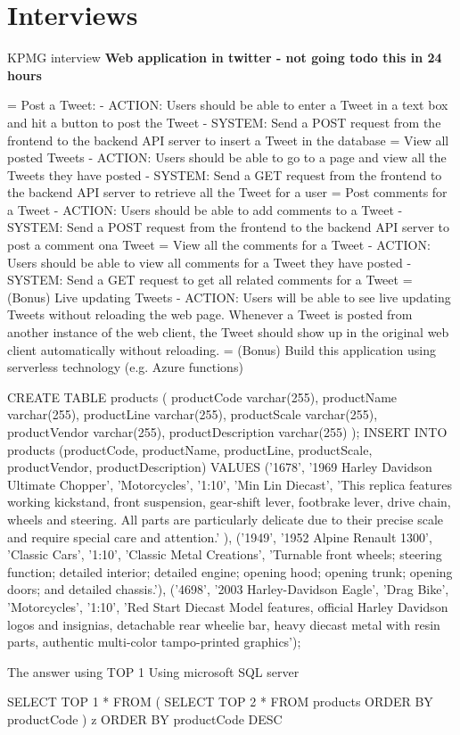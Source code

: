 
\chapter{Interviews}
KPMG interview
\textbf{Web application in twitter - not going todo this in 24 hours}

= Post a Tweet:
- ACTION: Users should be able to enter a Tweet in a text box and hit a button to post the Tweet
- SYSTEM: Send a POST request from the frontend to the backend API server to insert a Tweet in
the database
= View all posted Tweets
- ACTION: Users should be able to go to a page and view all the Tweets they have posted
- SYSTEM: Send a GET request from the frontend to the backend API server to retrieve all the Tweet
for a user
= Post comments for a Tweet
- ACTION: Users should be able to add comments to a Tweet
- SYSTEM: Send a POST request from the frontend to the backend API server to post a comment
ona Tweet
= View all the comments for a Tweet
- ACTION: Users should be able to view all comments for a Tweet they have posted
- SYSTEM: Send a GET request to get all related comments for a Tweet
= (Bonus) Live updating Tweets
- ACTION: Users will be able to see live updating Tweets without reloading the web page. Whenever
a Tweet is posted from another instance of the web client, the Tweet should show up in the original
web client automatically without reloading.
= (Bonus) Build this application using serverless technology (e.g. Azure functions)

\begin{listing}[caption={SQL Query for KPMG Interview}]
CREATE TABLE products (
productCode varchar(255),
productName varchar(255),
productLine varchar(255),
productScale varchar(255),
productVendor varchar(255),
productDescription varchar(255)
);
INSERT INTO products (productCode, productName, productLine, productScale,
productVendor, productDescription)
VALUES ('1678',
'1969 Harley Davidson Ultimate Chopper',
'Motorcycles',
'1:10',
'Min Lin Diecast',
'This replica features working kickstand, front suspension, gear-shift lever, footbrake lever, drive chain, wheels and steering. All parts are particularly delicate due to their precise scale and require special care and attention.'
),
('1949',
'1952 Alpine Renault 1300',
'Classic Cars',
'1:10',
'Classic Metal Creations',
'Turnable front wheels; steering function; detailed interior; detailed engine; opening hood; opening trunk; opening doors; and detailed chassis.'),
('4698',
'2003 Harley-Davidson Eagle',
'Drag Bike',
'Motorcycles',
'1:10',
'Red Start Diecast Model features, official Harley Davidson logos and insignias, detachable rear wheelie bar, heavy diecast metal with resin parts, authentic multi-color tampo-printed graphics');
\end{listing}

The answer using TOP 1 Using microsoft SQL server
\begin{listing}[caption={SQL Query for KPMG Interview -- Answer}]
SELECT TOP 1 *
FROM (
  SELECT TOP 2 * 
  FROM products
  ORDER BY productCode
) z
ORDER BY productCode DESC
\end{listing}